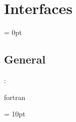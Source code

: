 
\section{Interfaces} 


\parskip = 0pt

\vspace{3mm} \subsection*{General}

: 

fortran
\vspace{2mm}

\vspace{5mm}\parskip = 10pt 
